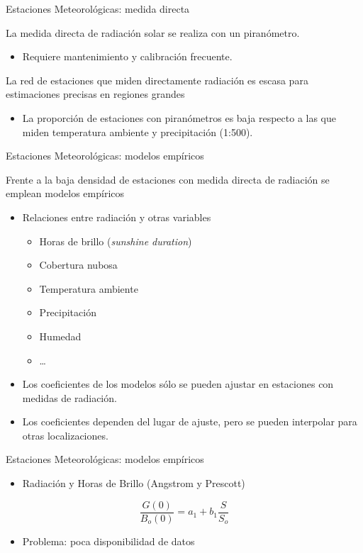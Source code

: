 \documentclass[xcolor={usenames,svgnames,dvipsnames}]{beamer}
\begin{document}
\begin{frame}[label=sec-2-3]{Estaciones Meteorológicas: medida directa}
\begin{block}{La medida directa de radiación solar se realiza con un piranómetro.}
\begin{itemize}
\item Requiere mantenimiento y calibración frecuente.
\end{itemize}
\end{block}
\begin{block}{La red de estaciones que miden directamente radiación es escasa para estimaciones precisas en regiones grandes}
\begin{itemize}
\item La proporción de estaciones con piranómetros es baja respecto a
las que miden temperatura ambiente y precipitación (1:500).
\end{itemize}
\end{block}
\end{frame}
\begin{frame}[label=sec-2-4]{Estaciones Meteorológicas: modelos empíricos}
\begin{block}{Frente a la baja densidad de estaciones con medida directa de radiación se emplean modelos empíricos}
\begin{itemize}
\item Relaciones entre radiación y otras variables
\begin{itemize}
\item Horas de brillo (\emph{sunshine duration})
\item Cobertura nubosa
\item Temperatura ambiente
\item Precipitación
\item Humedad
\item \ldots{}
\end{itemize}
\item Los coeficientes de los modelos sólo se pueden ajustar en estaciones
con medidas de radiación.
\item Los coeficientes dependen del lugar de ajuste, pero se pueden
interpolar para otras localizaciones.
\end{itemize}
\end{block}
\end{frame}
\begin{frame}[label=sec-2-5]{Estaciones Meteorológicas: modelos empíricos}
\begin{itemize}
\item Radiación y Horas de Brillo (Angstrom y Prescott)
\end{itemize}

\[
\frac{G(0)}{B_o(0)} = a_1 + b_1 \frac{S}{S_o}
\]

\begin{itemize}
\item Problema: poca disponibilidad de datos
\end{itemize}
\end{frame}
\end{document}
